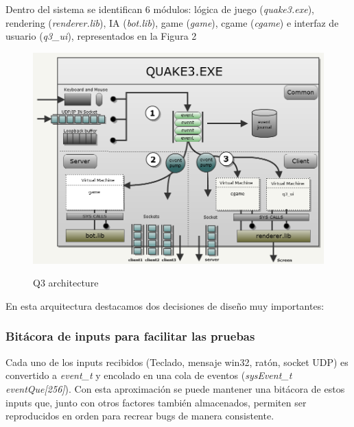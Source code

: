 \documentclass[a4paper,12pt]{report}
\begin{document}
	Dentro del sistema se identifican 6 módulos: lógica de juego (\textit{quake3.exe}), rendering (\textit{renderer.lib}), IA (\textit{bot.lib}), game (\textit{game}), cgame (\textit{cgame}) e interfaz de usuario (\textit{q3\_ui}), representados en la Figura 2  

		\begin{center}
			\begin{figure}[h]
				\includegraphics[width=1\textwidth]{images/q3_architecture}
				\label{fig:architecture}
				\caption{Q3 architecture}
			\end{figure}
		\end{center}
	
	En esta arquitectura destacamos dos decisiones de diseño muy importantes:
	
	\subsubsection{Bitácora de inputs para facilitar las pruebas}
	
	Cada uno de los inputs recibidos (Teclado, mensaje win32, ratón, socket UDP) es convertido a \textit{event\_t} y encolado en una cola de eventos (\textit{sysEvent\_t eventQue[256]}). Con esta aproximación se puede mantener una bitácora de estos inputs que, junto con otros factores también almacenados, permiten ser reproducidos en orden para recrear bugs de manera consistente.\\
	
\end{document}
